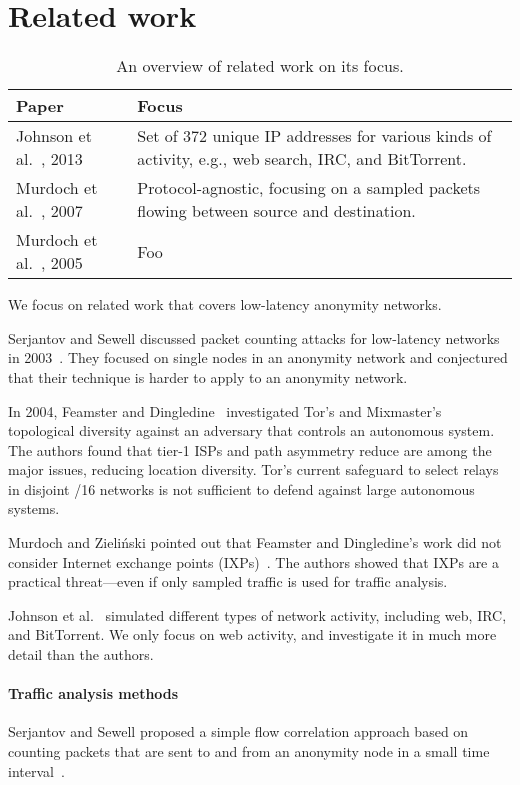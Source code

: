 \section{Related work}
\label{sec:related_work}

\begin{table*}[t]
	\centering
	\begin{tabular}{lp{7cm}}
	\textbf{Paper} & \textbf{Focus} \\
	\hline
	Johnson et al.~\cite{Johnson2013a}, 2013 & Set of 372 unique IP addresses for
	various kinds of activity, e.g., web search, IRC, and BitTorrent. \\
	\hline
	Murdoch et al.~\cite{Murdoch2007a}, 2007 & Protocol-agnostic, focusing on a
	sampled packets flowing between source and destination. \\
	\hline
	Murdoch et al.~\cite{Murdoch2005a}, 2005 & Foo \\
	\end{tabular}
	\caption{An overview of related work on its focus.}
	\label{tab:related-focus}
\end{table*}

We focus on related work that covers low-latency anonymity networks.

Serjantov and Sewell discussed packet counting attacks for low-latency networks
in 2003~\cite{Serjantov2003a}.  They focused on single nodes in an anonymity
network and conjectured that their technique is harder to apply to an anonymity
network.

In 2004, Feamster and Dingledine~\cite{Feamster2004a} investigated Tor's and
Mixmaster's topological diversity against an adversary that controls an
autonomous system.  The authors found that tier-1 ISPs and path asymmetry reduce
are among the major issues, reducing location diversity.  Tor's current
safeguard to select relays in disjoint /16 networks is not sufficient to defend
against large autonomous systems.

Murdoch and Zieli\'{n}ski pointed out that Feamster and Dingledine's work did
not consider Internet exchange points (IXPs)~\cite{Murdoch2007a}.  The authors
showed that IXPs are a practical threat---even if only sampled traffic is used
for traffic analysis.

Johnson et al.~\cite{Johnson2013a} simulated different types of network
activity, including web, IRC, and BitTorrent.  We only focus on web activity,
and investigate it in much more detail than the authors.

\paragraph{Traffic analysis methods}
Serjantov and Sewell proposed a simple flow correlation approach based on
counting packets that are sent to and from an anonymity node in a small time
interval~\cite{Serjantov2003a}.


